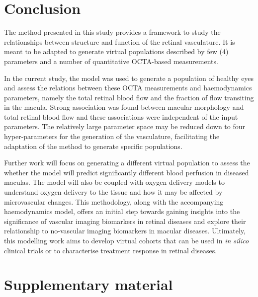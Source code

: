 \documentclass[11pt,]{article}
\newcommand{\supplementarysection}{%
  \setcounter{figure}{0}%
  \setcounter{table}{0}
  \let\oldthefigure\thefigure%
  \let\oldthetable\thetable
  \renewcommand{\thefigure}{S\oldthefigure}%
  \renewcommand{\thetable}{S\oldthetable}
  \section{Supplementary material}%
  \let\oldsection\section%
  \renewcommand{\section}{%
    \let\thefigure\oldthefigure%
    \let\section\oldsection%
    \oldsection%
  }
}
\begin{document}
\section{Conclusion}\label{sec:conclusion}

The method presented in this study provides a framework to study the relationships between structure and function of the retinal vasculature.
It is meant to be adapted to generate virtual populations described by few (4) parameters and a number of quantitative OCTA-based measurements.

In the current study, the model was used to generate a population of healthy eyes and assess the relations between these OCTA measurements and haemodynamics parameters, namely the total retinal blood flow and the fraction of flow transiting in the macula.
Strong association was found between macular morphology and total retinal blood flow and these associations were independent of the input parameters.
The relatively large parameter space may be reduced down to four hyper-parameters for the generation of the vasculature, facilitating the adaptation of the method to generate specific populations.

Further work will focus on generating a different virtual population to assess the whether the model will predict significantly different blood perfusion in diseased maculas.
The model will also be coupled with oxygen delivery models to understand oxygen delivery to the tissue and how it may be affected by microvascular changes.
This methodology, along with the accompanying haemodynamics model, offers an initial step towards gaining insights into the significance of vascular imaging biomarkers in retinal diseases and explore their relationship to no-vascular imaging biomarkers in macular diseases.
Ultimately, this modelling work aims to develop virtual cohorts that can be used in \textit{in silico} clinical trials or to characterise treatment response in retinal diseases.



\supplementarysection
\end{document}
